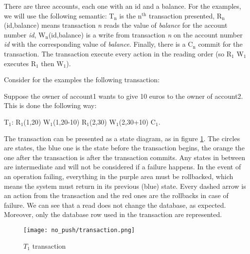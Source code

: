 There are three accounts, each one with an id and a balance. For the examples, we will use the following semantic: T$_{\text{n}}$ is the n$^{\text{th}}$ transaction presented, R$_{\text{n}}$(id,balance) means transaction \emph{n} reads the value of \emph{balance} for the account number \emph{id}, W$_{\text{n}}$(id,balance) is a write from transaction \emph{n} on the account number \emph{id} with the corresponding value of \emph{balance}. Finally, there is a C$_{\text{n}}$ commit for the transaction. The transaction execute every action in the reading order (so R$_{\text{1}}$ W$_{\text{1}}$ executes R$_{\text{1}}$ then W$_{\text{1}}$).

Consider for the examples the following transaction:

Suppose the owner of account1 wants to give 10 euros to the owner of account2. This is done the following way:

T$_{\text{1}}$: R$_{\text{1}}$(1,20) W$_{\text{1}}$(1,20-10) R$_{\text{1}}$(2,30) W$_{\text{1}}$(2,30+10) C$_{\text{1}}$.

The transaction can be presented as a state diagram, as in figure \ref{fig:transaction}. The circles are states, the blue one is the state before the transaction begins, the orange the one after the transaction is after the transaction commits. Any states in between are intermediate and will not be considered if a failure happens. In the event of an operation failing, everything in the purple area must be rollbacked, which means the system must return in its previous (blue) state. Every dashed arrow is an action from the transaction and the red ones are the rollbacks in case of failure. We can see that a read does not change the database, as expected. Moreover, only the database row used in the transaction are represented.


\begin{figure}[H]
  \vspace{-10pt}
  \centering
  \centerline{\texttt{[image: no\_push/transaction.png]}}
  \vspace{-5pt}
  \caption{$T_1$ transaction}
  \vspace{-5pt}
  \label{fig:transaction}
\end{figure}

